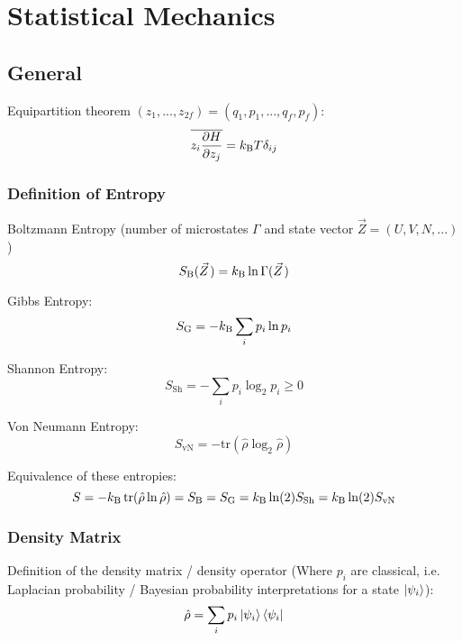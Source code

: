\section{Statistical Mechanics}
	\subsection{General}
		\noindent
		Equipartition theorem $(z_1,...,z_{2f}) = (q_1, p_1, ..., q_f, p_f)$:
		\begin{equation}
			\overline{ z_i \pdv{H}{z_j}} = k_{\text{B}} T \delta_{ij}
		\end{equation}

		\subsubsection{Definition of Entropy}
			\noindent
			Boltzmann Entropy (number of microstates $\Gamma$ and state vector $\vec{Z}=(U,V,N,...)$)
			\begin{equation}
				S_\text{B}(\vec{Z}) = \kB \ln\Gamma(\vec{Z})
			\end{equation}

			\noindent
			Gibbs Entropy:
			\begin{equation}
				S_\text{G} = -k_{\text{B}} \sum_i p_i \ln p_i
			\end{equation}

			\noindent
			Shannon Entropy:
			\begin{equation}
				S_\text{Sh} = -\sum_i p_i\log_2{p_i} \ge 0
			\end{equation}

			\noindent
			Von Neumann Entropy:
			\begin{equation}
				S_\text{vN} = -\mathrm{tr}(\hat{\rho}\log_2\hat{\rho})
			\end{equation}

			\noindent
			Equivalence of these entropies:
			\begin{equation}
				S = -k_{\text{B}}\,\mathrm{tr}(\hat{\rho} \ln \hat{\rho}) = S_\text{B} = S_\text{G} = k_{\text{B}}\ln(2) S_\text{Sh} = k_{\text{B}}\ln(2) S_\text{vN}
			\end{equation}

		\subsubsection{Density Matrix}
			\noindent
			Definition of the density matrix / density operator (Where $p_i$ are classical, i.e. Laplacian probability / Bayesian probability interpretations for a state $\Ket{\psi_i}$):
			\begin{equation}
				\hat{\rho} = \sum_i p_i \Ket{\psi_i}\Bra{\psi_i}
			\end{equation}

